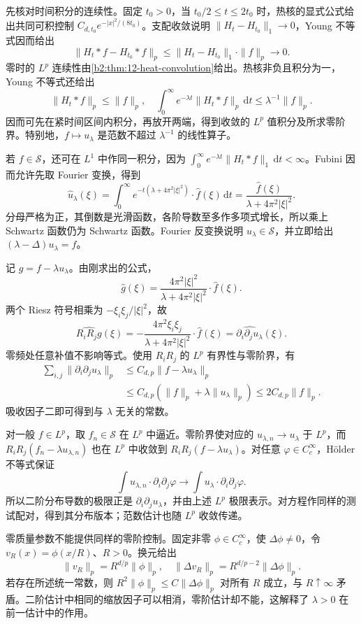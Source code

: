 \begin{solution}
先核对时间积分的连续性。固定 \(t_0>0\)，当 \(t_0/2\leq t\leq2t_0\) 时，热核的显式公式给出共同可积控制 \(C_{d,t_0}e^{-|x|^2/(8t_0)}\)。支配收敛说明 \(\|H_t-H_{t_0}\|_1\to0\)，Young 不等式因而给出
\[
 \|H_t*f-H_{t_0}*f\|_p
 \leq\|H_t-H_{t_0}\|_1\cdot\|f\|_p\longrightarrow0.
\]
零时的 \(L^p\) 连续性由\cref{b2:thm:12-heat-convolution}给出。热核非负且积分为一，Young 不等式还给出
\[
 \|H_t*f\|_p\leq\|f\|_p,
 \quad\int_0^\infty e^{-\lambda t}\|H_t*f\|_p\,\mathrm dt
                  \leq\lambda^{-1}\|f\|_p.
\]
因而可先在紧时间区间内积分，再放开两端，得到收敛的 \(L^p\) 值积分及所求零阶界。特别地，\(f\mapsto u_\lambda\) 是范数不超过 \(\lambda^{-1}\) 的线性算子。

若 \(f\in\mathcal S\)，还可在 \(L^1\) 中作同一积分，因为
\(\int_0^\infty e^{-\lambda t}\|H_t*f\|_1\,\mathrm dt<\infty\)。Fubini 因而允许先取 Fourier 变换，得到
\[
 \widehat u_\lambda(\xi)
 =\int_0^\infty e^{-t(\lambda+4\pi^2|\xi|^2)}
                 \cdot\widehat f(\xi)\,\mathrm dt
 =\frac{\widehat f(\xi)}{\lambda+4\pi^2|\xi|^2}.
\]
分母严格为正，其倒数是光滑函数，各阶导数至多作多项式增长，所以乘上 Schwartz 函数仍为 Schwartz 函数。Fourier 反变换说明 \(u_\lambda\in\mathcal S\)，并立即给出
\((\lambda-\Delta)u_\lambda=f\)。

记 \(g=f-\lambda u_\lambda\)。由刚求出的公式，
\[
 \widehat g(\xi)=\frac{4\pi^2|\xi|^2}{\lambda+4\pi^2|\xi|^2}
                       \cdot\widehat f(\xi).
\]
两个 Riesz 符号相乘为 \(-\xi_i\xi_j/|\xi|^2\)，故
\[
 \widehat{R_iR_jg}(\xi)
 =-\frac{4\pi^2\xi_i\xi_j}{\lambda+4\pi^2|\xi|^2}
                       \cdot\widehat f(\xi)
 =\widehat{\partial_i\partial_ju_\lambda}(\xi).
\]
零频处任意补值不影响等式。使用 \(R_iR_j\) 的 \(L^p\) 有界性与零阶界，有
\[
 \begin{aligned}
 \sum_{i,j}\|\partial_i\partial_ju_\lambda\|_p
 &\leq C_{d,p}\|f-\lambda u_\lambda\|_p\\
 &\leq C_{d,p}(\|f\|_p+\lambda\|u_\lambda\|_p)
 \leq2C_{d,p}\|f\|_p.
 \end{aligned}
\]
吸收因子二即可得到与 \(\lambda\) 无关的常数。

对一般 \(f\in L^p\)，取 \(f_n\in\mathcal S\) 在 \(L^p\) 中逼近。零阶界使对应的 \(u_{\lambda,n}\to u_\lambda\) 于 \(L^p\)，而
\(R_iR_j(f_n-\lambda u_{\lambda,n})\)
也在 \(L^p\) 中收敛到 \(R_iR_j(f-\lambda u_\lambda)\)。对任意 \(\varphi\in C_c^\infty\)，Hölder 不等式保证
\[
 \int u_{\lambda,n}\cdot\partial_i\partial_j\varphi
 \longrightarrow\int u_\lambda\cdot\partial_i\partial_j\varphi.
\]
所以二阶分布导数的极限正是 \(\partial_i\partial_ju_\lambda\)，并由上述 \(L^p\) 极限表示。对方程作同样的测试配对，得到其分布版本；范数估计也随 \(L^p\) 收敛传递。

零质量参数不能提供同样的零阶控制。固定非零 \(\phi\in C_c^\infty\)，使 \(\Delta\phi\ne0\)，令 \(v_R(x)=\phi(x/R)\)、\(R>0\)。换元给出
\[
 \|v_R\|_p=R^{d/p}\|\phi\|_p,
 \quad\|\Delta v_R\|_p=R^{d/p-2}\|\Delta\phi\|_p.
\]
若存在所述统一常数，则 \(R^2\|\phi\|_p\leq C\|\Delta\phi\|_p\) 对所有 \(R\) 成立，与 \(R\uparrow\infty\) 矛盾。二阶估计中相同的缩放因子可以相消，零阶估计却不能，这解释了 \(\lambda>0\) 在前一估计中的作用。
\end{solution}

